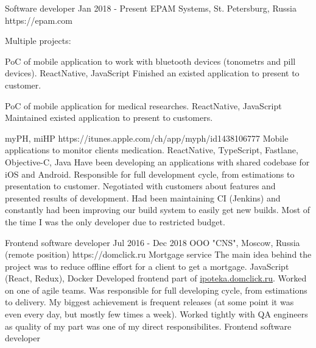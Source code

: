 \documentclass[11pt,a4paper,sans]{awesomecv}
\begin{document}
\begin{cventries}
\cventry
    {Software developer}
    {Jan 2018 - Present}
    {EPAM Systems, St. Petersburg, Russia}
    {https://epam.com}
    {
      Multiple projects:\newline
      \begin{cvprojects}{0.8ex}
      \item \cvproject
          {PoC of mobile application to work with bluetooth devices (tonometrs and pill devices).}
          {}{}
          {ReactNative, JavaScript}
          {Finished an existed application to present to customer.}
      \item \cvproject
          {PoC of mobile application for medical researches.}
          {}{}
          {ReactNative, JavaScript}
          {Maintained existed application to present to customers.}
      \item \cvproject
          {myPH, miHP}
          {https://itunes.apple.com/ch/app/myph/id1438106777}
          {Mobile applications to monitor clients medication.}
          {ReactNative, TypeScript, Fastlane, Objective-C, Java}
          {
            Have been developing an applications with shared codebase for iOS and Android.
            Responsible for full development cycle, from estimations to presentation to customer.
            Negotiated with customers about features and presented results of development.
            Had been maintaining CI (Jenkins) and constantly had been improving our build system to easily get new builds.
            Most of the time I was the only developer due to restricted budget.
          }
      \end{cvprojects}
    }
\cventry
    {Frontend software developer}
    {Jul 2016 - Dec 2018}
    {OOO "CNS", Moscow, Russia (remote position)}
    {https://domclick.ru}
    {
      \cvproject
          {Mortgage service}
          {}
          {The main idea behind the project was to reduce offline effort for a client to get a mortgage.}
          {JavaScript (React, Redux), Docker}
          {
            Developed frontend part of \href{http://ipoteka.domclick.ru}{ipoteka.domclick.ru}.
            Worked on one of agile teams.
            Was responsible for full developing cycle, from estimations to delivery.
            My biggest achievement is frequent releases (at some point it was even
            every day, but mostly few times a week).
            Worked tightly with QA engineers as quality of my part was one of my direct responsibilites.
          }
    }
\cventry
    {Frontend software developer}

\end{cventries}
\end{document}
